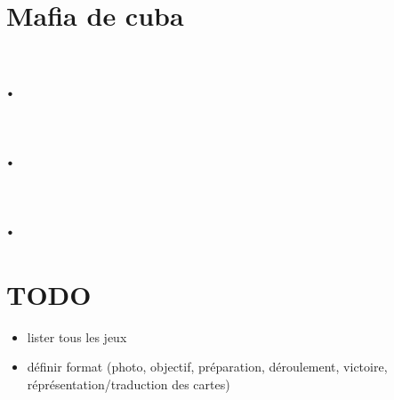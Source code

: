 \documentclass{book}
\begin{document}
\section{Mafia de cuba}
\section{.}
\section{.}
\section{.}


\newpage
\section{TODO}
\begin{itemize}
    \item lister tous les jeux
    \item définir format (photo, objectif, préparation, déroulement, victoire, réprésentation/traduction des cartes)
\end{itemize}
\end{document}
